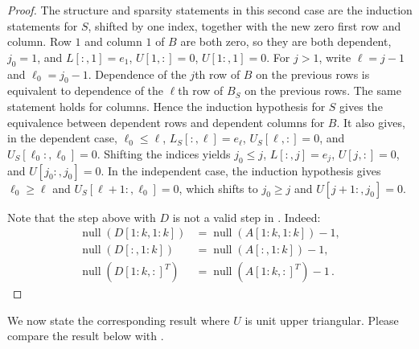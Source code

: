 \documentclass[10pt,twoside]{siamart1116}
\DeclareMathOperator{\nl}{null}
\numberwithin{theorem}{section}
\begin{document}
\begin{proof}
  The structure and sparsity statements in this second case are the induction statements for $S$, shifted by one index, together with the new zero first row and column. Row $1$ and column $1$ of $B$ are both zero, so they are both dependent, $j_0=1$, and $L[:,1]=e_1$, $U[1,:]=0$, $U[1:,1]=0$. For $j>1$, write $\ell=j-1$ and $\ell_0=j_0-1$. Dependence of the $j$th row of $B$ on the previous rows is equivalent to dependence of the $\ell$th row of $B_S$ on the previous rows. The same statement holds for columns. Hence the induction hypothesis for $S$ gives the equivalence between dependent rows and dependent columns for $B$. It also gives, in the dependent case, $\ell_0\le \ell$, $L_S[:,\ell]=e_\ell$, $U_S[\ell,:]=0$, and $U_S[\ell_0:,\ell_0]=0$. Shifting the indices yields $j_0\le j$, $L[:,j]=e_j$, $U[j,:]=0$, and $U[j_0:,j_0]=0$. In the independent case, the induction hypothesis gives $\ell_0\ge\ell$ and $U_S[\ell+1:,\ell_0]=0$, which shifts to $j_0\ge j$ and $U[j+1:,j_0]=0$.

  Note that the step above with $D$ is not a valid step in . Indeed:
  \begin{align*}
    \nl(D[1:k,1:k])   & = \nl(A[1:k,1:k]) - 1, \\
    \nl(D[:,1:k])     & = \nl(A[:,1:k]) - 1, \\
    \nl({D[1:k,:]}^T) & = \nl({A[1:k,:]}^T) - 1 \,.
  \end{align*}
\end{proof}

We now state the corresponding result where $U$ is unit upper triangular. Please compare the result below with .
\end{document}
